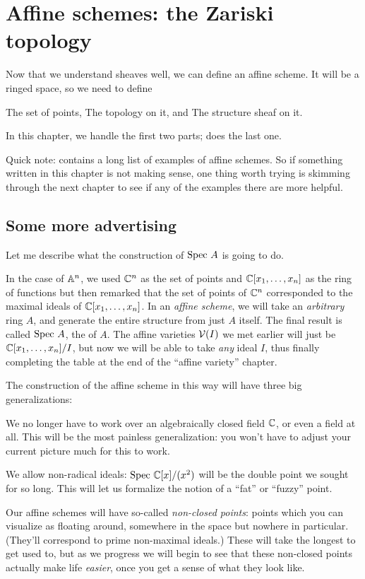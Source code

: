 \chapter{Affine schemes: the Zariski topology}
\label{ch:spec_zariski}
Now that we understand sheaves well,
we can define an affine scheme.
It will be a ringed space, so we need to define
\begin{itemize}
	\ii The set of points,
	\ii The topology on it, and
	\ii The structure sheaf on it.
\end{itemize}
In this chapter, we handle the first two parts;
 does the last one.

Quick note: 
contains a long list of examples of affine schemes.
So if something written in this chapter is not making sense,
one thing worth trying is skimming through the next chapter
to see if any of the examples there are more helpful.

\section{Some more advertising}
Let me describe what the construction of $\text{Spec } A$ is going to do.

In the case of $\mathbb A^n$, we used $\mathbb C^n$ as the set of points
and $\mathbb C[x_1, \dots, x_n]$ as the ring of functions
but then remarked that the set of points
of $\mathbb C^n$ corresponded to the maximal ideals of $\mathbb C[x_1, \dots, x_n]$.
In an \emph{affine scheme}, we will take an \emph{arbitrary} ring $A$,
and generate the entire structure from just $A$ itself.
The final result is called $\text{Spec } A$, the  of $A$.
The affine varieties $\mathcal V(I)$ we met earlier will just be
$\mathbb C[x_1, \dots, x_n] / I$, but now we will be able to take
\emph{any} ideal $I$, thus finally completing the table at the end
of the ``affine variety'' chapter.

The construction of the affine scheme in this way
will have three big generalizations:
\begin{enumerate}
	\ii We no longer have to work over an algebraically
	closed field $\mathbb C$, or even a field at all.
	This will be the most painless generalization:
	you won't have to adjust your current picture much for this to work.

	\ii We allow non-radical ideals:
	$\text{Spec } \mathbb C[x] / (x^2)$ will be the double point
	we sought for so long.
	This will let us formalize the notion of a ``fat'' or ``fuzzy'' point.

	\ii Our affine schemes will have so-called \emph{non-closed points}:
	points which you can visualize as floating around,
	somewhere in the space but nowhere in particular.
	(They'll correspond to prime non-maximal ideals.)
	These will take the longest to get used to,
	but as we progress we will begin to see that these non-closed points
	actually make life \emph{easier},
	once you get a sense of what they look like.
\end{enumerate}


